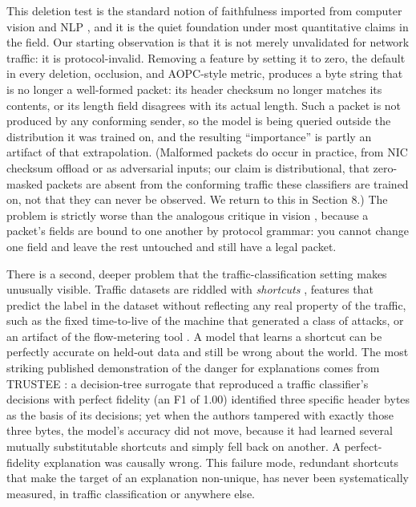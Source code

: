 \documentclass[journal]{IEEEtran}
\begin{document}
This deletion test is the standard notion of faithfulness imported from
computer vision and NLP \cite{samek2017evaluating,deyoung2020eraser},
and it is the quiet foundation under most quantitative claims in the
field. Our starting observation is that it is not merely unvalidated for
network traffic: it is protocol-invalid. Removing a feature by setting
it to zero, the default in every deletion, occlusion, and AOPC-style
metric, produces a byte string that is no longer a well-formed packet:
its header checksum no longer matches its contents, or its length field
disagrees with its actual length. Such a packet is not produced by any
conforming sender, so the model is being queried outside the
distribution it was trained on, and the resulting ``importance'' is
partly an artifact of that extrapolation. (Malformed packets do occur in
practice, from NIC checksum offload or as adversarial inputs; our claim
is distributional, that zero-masked packets are absent from the
conforming traffic these classifiers are trained on, not that they can
never be observed. We return to this in Section 8.) The problem is
strictly worse than the analogous critique in vision
\cite{hooker2019benchmark,rong2022consistent}, because a packet's fields
are bound to one another by protocol grammar: you cannot change one
field and leave the rest untouched and still have a legal packet.

There is a second, deeper problem that the traffic-classification
setting makes unusually visible. Traffic datasets are riddled with
\emph{shortcuts} \cite{geirhos2020shortcut}, features that predict the
label in the dataset without reflecting any real property of the
traffic, such as the fixed time-to-live of the machine that generated a
class of attacks, or an artifact of the flow-metering tool
\cite{engelen2021troubleshooting}. A model that learns a shortcut can be
perfectly accurate on held-out data and still be wrong about the world.
The most striking published demonstration of the danger for explanations
comes from TRUSTEE \cite{jacobs2022trustee}: a decision-tree surrogate
that reproduced a traffic classifier's decisions with perfect fidelity
(an F1 of 1.00) identified three specific header bytes as the basis of
its decisions; yet when the authors tampered with exactly those three
bytes, the model's accuracy did not move, because it had learned several
mutually substitutable shortcuts and simply fell back on another. A
perfect-fidelity explanation was causally wrong. This failure mode,
redundant shortcuts that make the target of an explanation non-unique,
has never been systematically measured, in traffic classification or
anywhere else.
\end{document}

